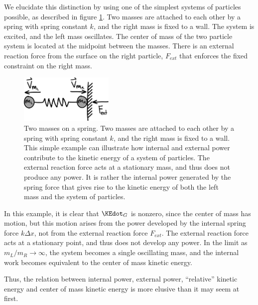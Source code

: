 We elucidate this distinction by using one of the simplest systems of particles possible, as described in figure \ref{fig:ParticleExplosion}. Two masses are attached to each other by a spring with spring constant $k$, and the right mass is fixed to a wall. The system is excited, and the left mass oscillates. The center of mass of the two particle system is located at the midpoint between the masses. There is an external reaction force from the surface on the right particle, $F_{ext}$ that enforces the fixed constraint on the right mass.

\begin{figure}[h]		%
\begin{centering}
\includegraphics[width=0.4\textwidth]{Figures/ParticleExplosion}\par
\end{centering}
\caption[Diagram: Two Masses on a Spring]{Two masses on a spring. Two masses are attached to each other by a spring with spring constant $k$, and the right mass is fixed to a wall. This simple example can illustrate how  internal and external power contribute to the kinetic energy of a system of particles. The external reaction force acts at a stationary mass, and thus does not produce any power. It is rather the internal power generated by the spring force that gives rise to the kinetic energy of both the left mass and the system of particles.}
\label{fig:ParticleExplosion}
\end{figure}
%

In this example, it is clear that $\KEdot_{G}$ is nonzero, since the center of mass has motion, but this motion arises from the power developed by the internal spring force $k\Delta x$, not from the external reaction force $F_{ext}$. The external reaction force acts at a stationary point, and thus does not develop any power. In the limit as $m_L/m_R \rightarrow \infty$, the system becomes a single oscillating mass, and the internal work becomes equivalent to the center of mass kinetic energy.

Thus, the relation between internal power, external power, ``relative'' kinetic energy and center of mass kinetic energy is more elusive than it may seem at first.

